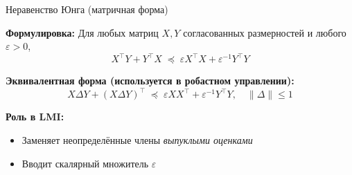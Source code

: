 \documentclass{beamer}
\begin{document}
\begin{frame}{Неравенство Юнга (матричная форма)}
	
	\begin{flushleft}
		
		\textbf{Формулировка:} Для любых матриц $X, Y$ согласованных размерностей и любого $\varepsilon > 0$,
		\[
		X^\top Y + Y^\top X \;\preceq\; \varepsilon X^\top X + \varepsilon^{-1} Y^\top Y
		\]
		
		
		\medskip
		
		\textbf{Эквивалентная форма (используется в робастном управлении):}
		\[
		X \Delta Y + (X \Delta Y)^\top
		\;\preceq\;
		\varepsilon XX^\top + \varepsilon^{-1} Y^\top Y,
		\quad \|\Delta\| \le 1
		\]
		
		\medskip
		
		\textbf{Роль в LMI:}
		\begin{itemize}
			\item Заменяет неопределённые члены \emph{выпуклыми оценками}
			\item Вводит скалярный множитель $\varepsilon$
		\end{itemize}
		
	\end{flushleft}
	
\end{frame}
\end{document}
